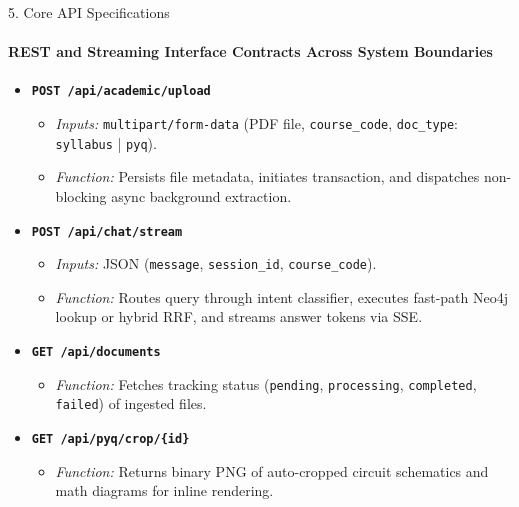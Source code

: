 \documentclass[aspectratio=169, 11pt]{beamer}
\begin{document}
\begin{frame}{5. Core API Specifications}
    \framesubtitle{REST and Streaming Interface Contracts Across System Boundaries}
    \begin{itemize}
        \item \textbf{\texttt{POST /api/academic/upload}}
        \begin{itemize}
            \item \textit{Inputs:} \texttt{multipart/form-data} (PDF file, \texttt{course\_code}, \texttt{doc\_type}: \texttt{syllabus} | \texttt{pyq}).
            \item \textit{Function:} Persists file metadata, initiates transaction, and dispatches non-blocking async background extraction.
        \end{itemize}
        \item \textbf{\texttt{POST /api/chat/stream}}
        \begin{itemize}
            \item \textit{Inputs:} JSON (\texttt{message}, \texttt{session\_id}, \texttt{course\_code}).
            \item \textit{Function:} Routes query through intent classifier, executes fast-path Neo4j lookup or hybrid RRF, and streams answer tokens via SSE.
        \end{itemize}
        \item \textbf{\texttt{GET /api/documents}}
        \begin{itemize}
            \item \textit{Function:} Fetches tracking status (\texttt{pending}, \texttt{processing}, \texttt{completed}, \texttt{failed}) of ingested files.
        \end{itemize}
        \item \textbf{\texttt{GET /api/pyq/crop/\{id\}}}
        \begin{itemize}
            \item \textit{Function:} Returns binary PNG of auto-cropped circuit schematics and math diagrams for inline rendering.
        \end{itemize}
    \end{itemize}
\end{frame}
\end{document}
